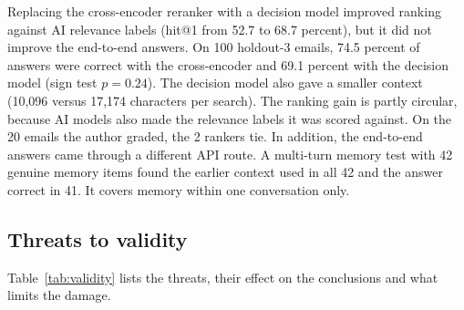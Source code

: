 Replacing the cross-encoder reranker with a decision model improved ranking against AI relevance labels (hit@1 from 52.7 to 68.7 percent), but it did not improve the end-to-end answers. On 100 holdout-3 emails, 74.5 percent of answers were correct with the cross-encoder and 69.1 percent with the decision model (sign test $p=0.24$). The decision model also gave a smaller context (10,096 versus 17,174 characters per search). The ranking gain is partly circular, because AI models also made the relevance labels it was scored against. On the 20 emails the author graded, the 2 rankers tie. In addition, the end-to-end answers came through a different API route. A multi-turn memory test with 42 genuine memory items found the earlier context used in all 42 and the answer correct in 41. It covers memory within one conversation only.

\subsection{Threats to validity}

Table~\ref{tab:validity} lists the threats, their effect on the conclusions and what limits the damage.


